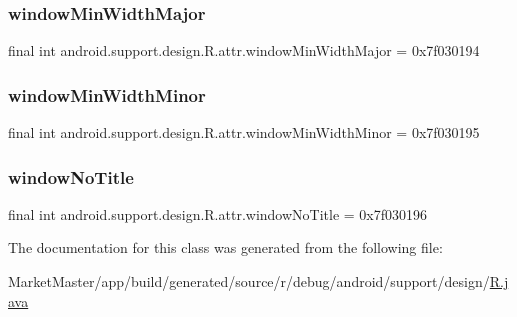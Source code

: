 \subsubsection{\texorpdfstring{window\+Min\+Width\+Major}{windowMinWidthMajor}}
{\footnotesize\ttfamily final int android.\+support.\+design.\+R.\+attr.\+window\+Min\+Width\+Major = 0x7f030194\hspace{0.3cm}{\ttfamily [static]}}

\mbox{\label{classandroid_1_1support_1_1design_1_1R_1_1attr_a1690dd58d6b1695579d1cbdcb36fa7b4}} 
\subsubsection{\texorpdfstring{window\+Min\+Width\+Minor}{windowMinWidthMinor}}
{\footnotesize\ttfamily final int android.\+support.\+design.\+R.\+attr.\+window\+Min\+Width\+Minor = 0x7f030195\hspace{0.3cm}{\ttfamily [static]}}

\mbox{\label{classandroid_1_1support_1_1design_1_1R_1_1attr_ae7659b443bdf6ecfbb0bb28a213c6670}} 
\subsubsection{\texorpdfstring{window\+No\+Title}{windowNoTitle}}
{\footnotesize\ttfamily final int android.\+support.\+design.\+R.\+attr.\+window\+No\+Title = 0x7f030196\hspace{0.3cm}{\ttfamily [static]}}



The documentation for this class was generated from the following file\+:\begin{DoxyCompactItemize}
\item 
Market\+Master/app/build/generated/source/r/debug/android/support/design/\mbox{\hyperlink{debug_2android_2support_2design_2R_8java}{R.\+java}}\end{DoxyCompactItemize}
